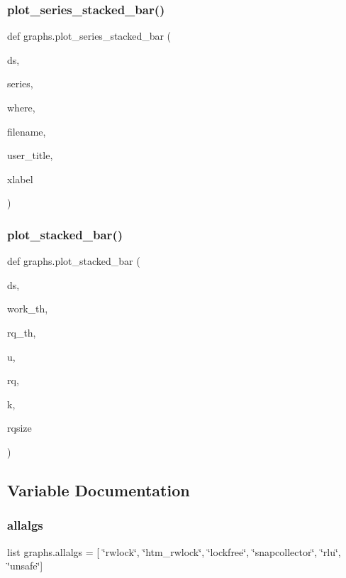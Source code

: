 \subsubsection{\texorpdfstring{plot\+\_\+series\+\_\+stacked\+\_\+bar()}{plot\_series\_stacked\_bar()}}
{\footnotesize\ttfamily def graphs.\+plot\+\_\+series\+\_\+stacked\+\_\+bar (\begin{DoxyParamCaption}\item[{}]{ds,  }\item[{}]{series,  }\item[{}]{where,  }\item[{}]{filename,  }\item[{}]{user\+\_\+title,  }\item[{}]{xlabel }\end{DoxyParamCaption})}

\mbox{\label{namespacegraphs_aa5bde0e5cc7ee270a041b393e894622a}} 
\subsubsection{\texorpdfstring{plot\+\_\+stacked\+\_\+bar()}{plot\_stacked\_bar()}}
{\footnotesize\ttfamily def graphs.\+plot\+\_\+stacked\+\_\+bar (\begin{DoxyParamCaption}\item[{}]{ds,  }\item[{}]{work\+\_\+th,  }\item[{}]{rq\+\_\+th,  }\item[{}]{u,  }\item[{}]{rq,  }\item[{}]{k,  }\item[{}]{rqsize }\end{DoxyParamCaption})}



\subsection{Variable Documentation}
\mbox{\label{namespacegraphs_a2605aec886e87bd01743496674459c24}} 
\subsubsection{\texorpdfstring{allalgs}{allalgs}}
{\footnotesize\ttfamily list graphs.\+allalgs = \mbox{[} \char`\"{}rwlock\char`\"{}, \char`\"{}htm\+\_\+rwlock\char`\"{}, \char`\"{}lockfree\char`\"{}, \char`\"{}snapcollector\char`\"{}, \char`\"{}rlu\char`\"{}, \char`\"{}unsafe\char`\"{}\mbox{]}}

